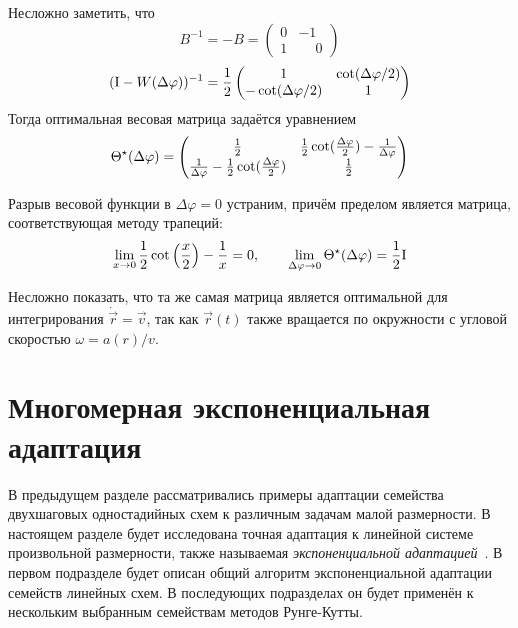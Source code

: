 Несложно заметить, что
\[
    B^{-1} = -B =
    \begin{pmatrix}
        0 & -1 \\
        1 & \phantom{-}0
    \end{pmatrix}
\]
\[
    (\mathrm{I} - W(\Delta \varphi))^{-1} =
    \frac{1}{2}
    \begin{pmatrix}
        1 & \cot(\Delta \varphi / 2) \\
        -\cot(\Delta \varphi / 2) & 1
    \end{pmatrix}
\]
Тогда оптимальная весовая матрица задаётся уравнением
\begin{equation}
    \label{eq:circular_orbit:optimal_Theta}
    \Theta^\star(\Delta \varphi) =
    \begin{pmatrix}
        \frac{1}{2} & \frac{1}{2} \cot(\frac{\Delta \varphi}{2}) - \frac{1}{\Delta \varphi} \\
        \frac{1}{\Delta \varphi} - \frac{1}{2} \cot(\frac{\Delta \varphi}{2}) & \frac{1}{2}
    \end{pmatrix}
\end{equation}

\begin{remark}
    \label{remark:circular_orbit:weight_function_limit_at_zero}
    Разрыв весовой функции в $ \Delta \varphi = 0 $ устраним,
    причём пределом является матрица, соответствующая методу трапеций:
    \[
        \lim_{x \to 0} \frac{1}{2} \cot\left( \frac{x}{2} \right) - \frac{1}{x} = 0,
        \qquad
        \lim_{\Delta \varphi \to 0} \Theta^\star(\Delta \varphi) = \frac{1}{2} \mathrm{I}
    \]
\end{remark}

Несложно показать, что та же самая матрица является оптимальной для интегрирования $ \dot{\vec{r}} = \vec{v} $,
так как $ \vec{r}(t) $ также вращается по окружности с угловой скоростью $ \omega = a(r) / v $.


\section{Многомерная экспоненциальная адаптация}
\label{section:methods:exponential_fitting}

В предыдущем разделе рассматривались примеры адаптации семейства двухшаговых одностадийных схем
к различным задачам малой размерности.
В настоящем разделе будет исследована точная адаптация к линейной системе произвольной размерности,
также называемая \emph{экспоненциальной адаптацией}~\cite{hollevoet2013exponential_fitting}.
В первом подразделе будет описан общий алгоритм экспоненциальной адаптации семейств линейных схем.
В последующих подразделах он будет применён к нескольким выбранным семействам методов Рунге-Кутты.


